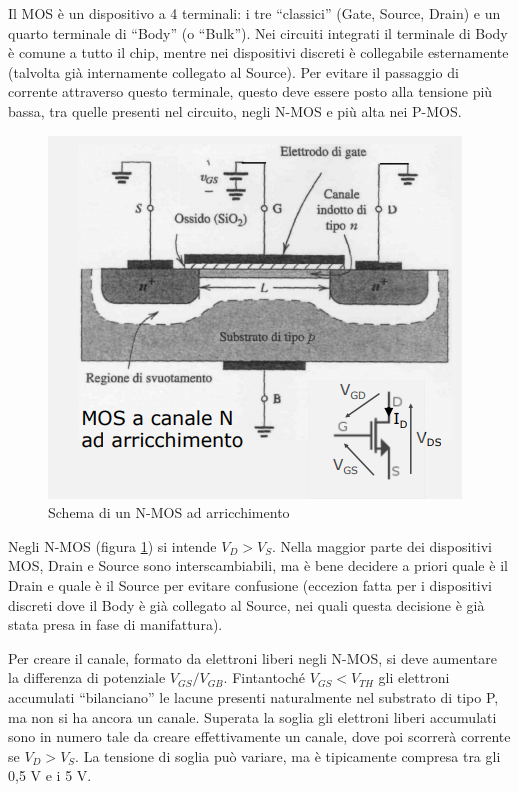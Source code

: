 \documentclass{article}
\begin{document}
Il MOS è un dispositivo a 4 terminali: i tre ``classici'' (Gate, Source, Drain) e un quarto terminale di ``Body'' (o ``Bulk''). Nei circuiti integrati il terminale di Body è comune a tutto il chip, mentre nei dispositivi discreti è collegabile esternamente (talvolta già internamente collegato al Source). Per evitare il passaggio di corrente attraverso questo terminale, questo deve essere posto alla tensione più bassa, tra quelle presenti nel circuito, negli N-MOS e più alta nei P-MOS.

\begin{figure}[h]
  \centering
  \includegraphics[scale=0.7]{IM_MOS_bis}
  \caption{Schema di un N-MOS ad arricchimento}
  \label{Schema_MOS_bis}
\end{figure}

Negli N-MOS (figura \ref{Schema_MOS_bis}) si intende $V_D > V_S$. Nella maggior parte dei dispositivi MOS, Drain e Source sono interscambiabili, ma è bene decidere a priori quale è il Drain e quale è il Source per evitare confusione (eccezion fatta per i dispositivi discreti dove il Body è già collegato al Source, nei quali questa decisione è già stata presa in fase di manifattura). 

\vspace{3mm}

Per creare il canale, formato da elettroni liberi negli N-MOS, si deve aumentare la differenza di potenziale $V_{GS}/V_{GB}$. Fintantoché $V_{GS} < V_{TH}$ gli elettroni accumulati ``bilanciano'' le lacune presenti naturalmente nel substrato di tipo P, ma non si ha ancora un canale. Superata la soglia gli elettroni liberi accumulati sono in numero tale da creare effettivamente un canale, dove poi scorrerà corrente se $V_D > V_S$. La tensione di soglia può variare, ma è tipicamente compresa tra gli 0,5 V e i 5 V.
\end{document}
